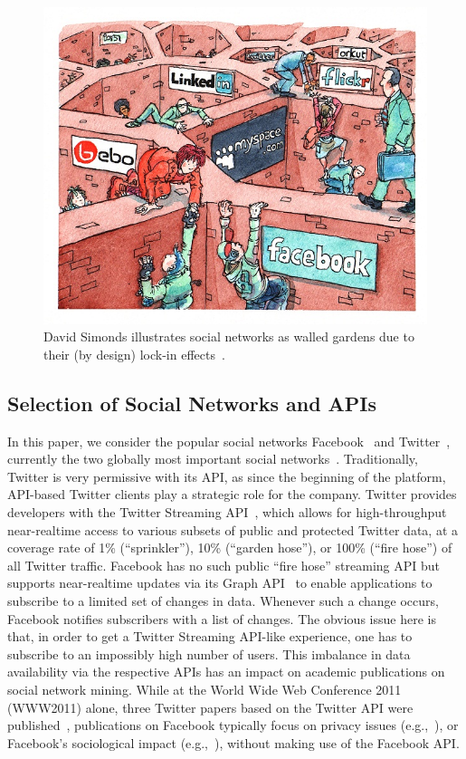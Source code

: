 \documentclass{iosart2c}
\begin{document}
\begin{figure}
\centering
\includegraphics[width=1.0\linewidth,trim=16px 17px 12px 15px,clip]{./resources/davidsimonds.jpg}
\caption{David Simonds illustrates social networks as walled gardens due to their (by design) lock-in effects~\cite{DavidSimonds}.}
\label{fig:DavidSimonds}
\end{figure}

\subsection{Selection of Social Networks and APIs}
In this paper, we consider the popular social networks Facebook~\cite{Facebook} and Twitter~\cite{Twitter}, currently the two globally most important social networks~\cite{comScoreTwitter, comScoreFacebook}.
Traditionally, Twitter is very permissive with its API, as since the beginning of the platform, API-based Twitter clients play a strategic role for the company.
Twitter provides developers with the Twitter Streaming API~\cite{TwitterStreamingAPI}, which allows for high-throughput near-realtime access to various subsets of public and protected Twitter data, at a coverage rate of 1\% (``sprinkler''), 10\% (``garden hose''), or 100\% (``fire hose'') of all Twitter traffic.
Facebook has no such public ``fire hose'' streaming API but supports near-realtime updates via its Graph API~\cite{FacebookRealtimeAPI} to enable applications to subscribe to a limited set of changes in data.
Whenever such a change occurs, Facebook notifies subscribers with a list of changes.
The obvious issue here is that, in order to get a Twitter Streaming API-like experience, one has to subscribe to an impossibly high number of users.
This imbalance in data availability via the respective APIs has an impact on academic publications on social network mining.
While at the World Wide Web Conference 2011 (WWW2011) alone, three Twitter papers based on the Twitter API were published~\cite{Meeder:2011:WKY:1963405.1963479, Romero:2011:DMI:1963405.1963503, Wu:2011:SWT:1963405.1963504}, publications on Facebook typically focus on privacy issues (e.g.,~\cite{liu:settings}), or Facebook's sociological impact (e.g.,~\cite{JCC4:JCC4367}), without making use of the Facebook API.
\end{document}
